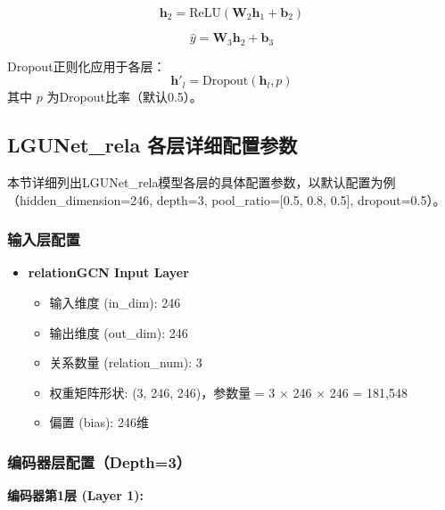 \begin{equation}
\mathbf{h}_2 = \text{ReLU}\left( \mathbf{W}_2 \mathbf{h}_1 + \mathbf{b}_2 \right)
\end{equation}

\begin{equation}
\hat{y} = \mathbf{W}_3 \mathbf{h}_2 + \mathbf{b}_3
\end{equation}

Dropout正则化应用于各层：
\begin{equation}
\mathbf{h}'_l = \text{Dropout}(\mathbf{h}_l, p)
\end{equation}
其中 $p$ 为Dropout比率（默认0.5）。

\subsection{LGUNet\_rela 各层详细配置参数}

本节详细列出LGUNet\_rela模型各层的具体配置参数，以默认配置为例（hidden\_dimension=246, depth=3, pool\_ratio=[0.5, 0.8, 0.5], dropout=0.5）。

\subsubsection{输入层配置}

\begin{itemize}
    \item \textbf{relationGCN Input Layer}
    \begin{itemize}
        \item 输入维度 (in\_dim): 246
        \item 输出维度 (out\_dim): 246
        \item 关系数量 (relation\_num): 3
        \item 权重矩阵形状: (3, 246, 246)，参数量 = 3 $\times$ 246 $\times$ 246 = 181,548
        \item 偏置 (bias): 246维
    \end{itemize}
\end{itemize}

\subsubsection{编码器层配置（Depth=3）}

\textbf{编码器第1层 (Layer 1):}

